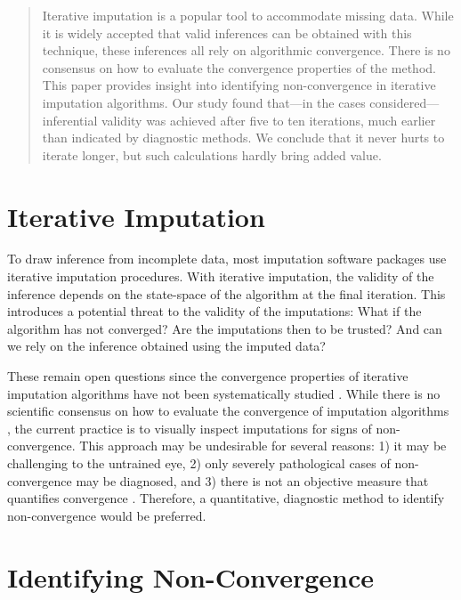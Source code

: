 \documentclass{article}
\begin{document}
\begin{abstract}
Iterative imputation is a popular tool to accommodate missing data. While it is widely accepted that valid inferences can be obtained with this technique, these inferences all rely on algorithmic convergence. There is no consensus on how to evaluate the convergence properties of the method. This paper provides insight into identifying non-convergence in iterative imputation algorithms. Our study found that---in the cases considered---inferential validity was achieved after five to ten iterations, much earlier than indicated by diagnostic methods. We conclude that it never hurts to iterate longer, but such calculations hardly bring added value.
\end{abstract}

\setcounter{footnote}{2}

\section{Iterative Imputation}
\label{intro}

To draw inference from incomplete data, most imputation software packages use iterative imputation procedures. With iterative imputation, the validity of the inference depends on the state-space of the algorithm at the final iteration. This introduces a potential threat to the validity of the imputations: What if the algorithm has not converged? Are the imputations then to be trusted? And can we rely on the inference obtained using the imputed data?

These remain open questions since the convergence properties of iterative imputation algorithms have not been systematically studied \citep[\(\S\) 6.5.2]{buur18}. While there is no scientific consensus on how to evaluate the convergence of imputation algorithms \citep{zhu15, taka17}, the current practice is to visually inspect imputations for signs of non-convergence. This approach may be undesirable for several reasons: 1) it may be challenging to the untrained eye, 2) only severely pathological cases of non-convergence may be diagnosed, and 3) there is not an objective measure that quantifies convergence \citep[\(\S\) 6.5.2]{buur18}. Therefore, a quantitative, diagnostic method to identify non-convergence would be preferred. 

\section{Identifying Non-Convergence}
\label{methods}
\end{document}
